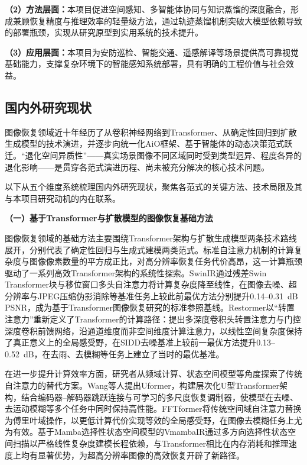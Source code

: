 \textbf{（2）方法层面：}本项目促进空间感知、多智能体协同与知识蒸馏的深度融合，形成兼顾恢复精度与推理效率的轻量级方法，通过轨迹蒸馏机制突破大模型依赖导致的部署瓶颈，实现从研究原型到实用系统的技术提升。

\textbf{（3）应用层面：}本项目为安防巡检、智能交通、遥感解译等场景提供高可靠视觉基础能力，支撑复杂环境下的智能感知系统部署，具有明确的工程价值与社会效益。

\subsection{国内外研究现状}

图像恢复领域近十年经历了从卷积神经网络到Transformer、从确定性回归到扩散生成模型的技术演进，并逐步向统一化AiO框架、基于智能体的动态决策范式跃迁。“退化空间异质性”——真实场景图像不同区域同时受到类型迥异、程度各异的退化影响——是贯穿各范式演进历程、尚未被充分解决的核心技术问题。

以下从五个维度系统梳理国内外研究现状，聚焦各范式的关键方法、技术局限及其与本项目研究动机的内在联系。

\textbf{（一）基于Transformer与扩散模型的图像恢复基础方法}

图像恢复领域的基础方法主要围绕Transformer架构与扩散生成模型两条技术路线展开，分别代表了确定性回归与生成式建模两类范式。标准自注意力机制的计算复杂度与图像像素数量的平方成正比，对高分辨率恢复任务代价高昂，这一计算瓶颈驱动了一系列高效Transformer架构的系统性探索。SwinIR\cite{swinir}通过残差Swin Transformer块与移位窗口多头自注意力将计算复杂度降至线性，在图像去噪、超分辨率与JPEG压缩伪影消除等基准任务上较此前最优方法分别提升0.14--0.31~dB PSNR，成为基于Transformer图像恢复研究的标准参照基线。Restormer\cite{restormer}以“转置注意力”重新定义了Transformer的计算路径：提出多深度卷积头转置注意力与门控深度卷积前馈网络，沿通道维度而非空间维度计算注意力，以线性空间复杂度保持了真正意义上的全局感受野，在SIDD去噪基准上较前一最优方法提升0.13--0.52~dB，在去雨、去模糊等任务上建立了当时的最优基准。

在进一步提升计算效率方面，研究者从频域计算、状态空间模型等角度探索了传统自注意力的替代方案。Wang等人\cite{uformer}提出Uformer，构建层次化U型Transformer架构，结合编码器--解码器跳跃连接与可学习的多尺度恢复调制器，使模型在去噪、去运动模糊等多个任务中同时保持高性能。FFTformer\cite{fftformer}将传统空间域自注意力替换为傅里叶域操作，以更低计算代价实现等效的全局感受野，在图像去模糊任务上尤为有效。基于Mamba选择性状态空间模型的VmambaIR\cite{vmambair}通过多方向选择性状态空间扫描以严格线性复杂度建模长程依赖，与Transformer相比在内存消耗和推理速度上均有显著优势，为超高分辨率图像的高效恢复开辟了新路径。

